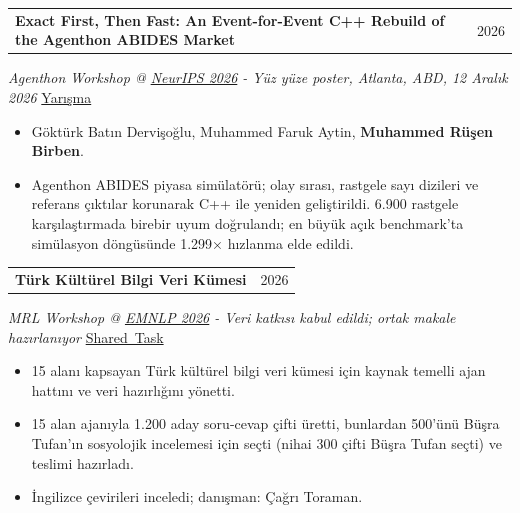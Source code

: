 \documentclass[11pt,a4paper]{article}
\makeatletter
\newcommand{\cvlink}[2]{\href{#1}{\textcolor{linkblue}{#2}}}
\newcommand{\cvheading}[2]{%
  \begin{tabularx}{\linewidth}{@{}>{\raggedright\arraybackslash}X@{\hspace{10pt}}r@{}}%
  \textbf{#1} & {\small\color{muted}#2}\\
  \end{tabularx}\par\nobreak
}
\newenvironment{cvpoints}{\begin{itemize}[leftmargin=12pt,itemsep=2pt,topsep=2pt,parsep=0pt]\small}{\end{itemize}}
\makeatother
\begin{document}
\begin{minipage}{\linewidth}\raggedright
\cvheading{Exact First, Then Fast: An Event-for-Event C++ Rebuild of the Agenthon ABIDES Market}{2026}
{\small{}\itshape{}\color{muted}Agenthon Workshop @ \cvlink{https://neurips.cc/Conferences/2026}{NeurIPS 2026} - Yüz yüze poster, Atlanta, ABD, 12 Aralık 2026}\hfill{\small{}%
\mbox{\cvlink{https://www.agenthon.net/}{Yarışma}}%
}\par\vspace{2pt}
\begin{cvpoints}
\item Göktürk Batın Dervişoğlu, Muhammed Faruk Aytin, \textbf{Muhammed Rüşen Birben}.
\item Agenthon ABIDES piyasa simülatörü; olay sırası, rastgele sayı dizileri ve referans çıktılar korunarak C++ ile yeniden geliştirildi. 6.900 rastgele karşılaştırmada birebir uyum doğrulandı; en büyük açık benchmark’ta simülasyon döngüsünde 1.299× hızlanma elde edildi.
\end{cvpoints}
\end{minipage}\par\vspace{5pt}
\begin{minipage}{\linewidth}\raggedright
\cvheading{Türk Kültürel Bilgi Veri Kümesi}{2026}
{\small{}\itshape{}\color{muted}MRL Workshop @ \cvlink{https://2026.emnlp.org/}{EMNLP 2026} - Veri katkısı kabul edildi; ortak makale hazırlanıyor}\hfill{\small{}%
\mbox{\cvlink{https://mrlbenchmarks.github.io/}{Shared Task}}%
}\par\vspace{2pt}
\begin{cvpoints}
\item 15 alanı kapsayan Türk kültürel bilgi veri kümesi için kaynak temelli ajan hattını ve veri hazırlığını yönetti.
\item 15 alan ajanıyla 1.200 aday soru-cevap çifti üretti, bunlardan 500’ünü Büşra Tufan’ın sosyolojik incelemesi için seçti (nihai 300 çifti Büşra Tufan seçti) ve teslimi hazırladı.
\item İngilizce çevirileri inceledi; danışman: Çağrı Toraman.
\end{cvpoints}
\end{minipage}\par\vspace{5pt}
\end{document}
